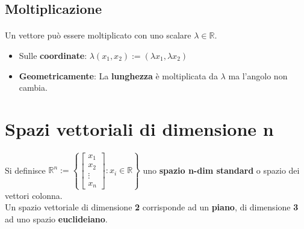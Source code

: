 \documentclass[a4paper, 12pt]{report}
\begin{document}
            \subsection{Moltiplicazione}
            \paragraph{}Un vettore può essere moltiplicato con uno scalare $\lambda \in \mathbb{R}$.
            \begin{itemize}
                \item Sulle \textbf{coordinate}: $\lambda (x_1,x_2):=(\lambda x_1,\lambda x_2)$
                \item \textbf{Geometricamente}: La \textbf{lunghezza} è moltiplicata da $\lambda$ ma l'angolo non cambia.
            \end{itemize}
        \clearpage
        \section{Spazi vettoriali di dimensione n}
            \paragraph{}Si definisce $\mathbb{R}^n:= \left \{
            \begin{bmatrix}
            x_1\\
            x_2\\
            \vdots\\
            x_n    
            \end{bmatrix}
            : x_i \in \mathbb{R}
            \right \}
            $
            uno \textbf{spazio n-dim standard} o spazio dei vettori colonna.\\
            Un spazio vettoriale di dimensione \textbf{2} corrisponde ad un \textbf{piano}, di dimensione \textbf{3} ad uno
            spazio \textbf{euclideiano}.
\end{document}
